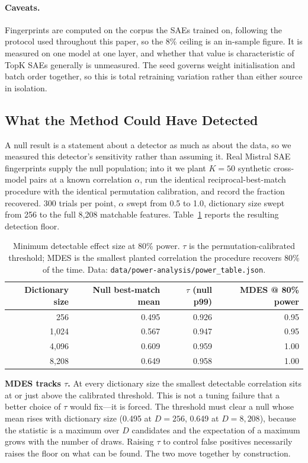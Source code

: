 \documentclass[11pt]{article}
\begin{document}
\paragraph{Caveats.} Fingerprints are computed on the corpus the SAEs trained on,
following the protocol used throughout this paper, so the 8\% ceiling is an in-sample
figure. It is measured on one model at one layer, and whether that value is
characteristic of TopK SAEs generally is unmeasured. The seed governs weight
initialisation and batch order together, so this is total retraining variation rather
than either source in isolation.

\subsection{What the Method Could Have Detected}
\label{sec:mdes}

A null result is a statement about a detector as much as about the data, so we measured
this detector's sensitivity rather than assuming it. Real Mistral SAE fingerprints supply
the null population; into it we plant $K = 50$ synthetic cross-model pairs at a known
correlation $\alpha$, run the identical reciprocal-best-match procedure with the identical
permutation calibration, and record the fraction recovered. 300 trials per point, $\alpha$
swept from 0.5 to 1.0, dictionary size swept from 256 to the full 8,208 matchable
features. Table~\ref{tab:mdes} reports the resulting detection floor.

\begin{table}[t]
  \centering
  \caption{Minimum detectable effect size at 80\% power. $\tau$ is the
    permutation-calibrated threshold; MDES is the smallest planted correlation the
    procedure recovers 80\% of the time. Data:
    \texttt{data/power-analysis/power\_table.json}.}
  \label{tab:mdes}
  \smallskip
  \begin{tabular}{rrrr}
    \toprule
    Dictionary size & Null best-match mean & $\tau$ (null p99) & MDES @ 80\% power \\
    \midrule
      256 & 0.495 & 0.926 & 0.95 \\
    1{,}024 & 0.567 & 0.947 & 0.95 \\
    4{,}096 & 0.609 & 0.959 & 1.00 \\
    8{,}208 & 0.649 & 0.958 & 1.00 \\
    \bottomrule
  \end{tabular}
\end{table}

\textbf{MDES tracks $\tau$.} At every dictionary size the smallest detectable correlation
sits at or just above the calibrated threshold. This is not a tuning failure that a better
choice of $\tau$ would fix---it is forced. The threshold must clear a null whose mean rises
with dictionary size (0.495 at $D = 256$, 0.649 at $D = 8{,}208$), because the statistic is
a maximum over $D$ candidates and the expectation of a maximum grows with the number of
draws. Raising $\tau$ to control false positives necessarily raises the floor on what can
be found. The two move together by construction.
\end{document}
